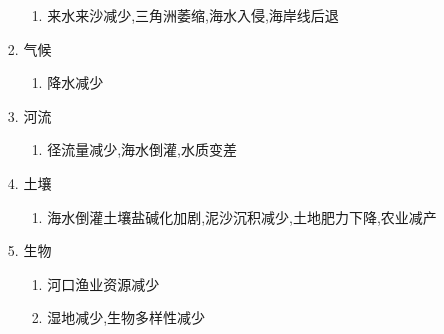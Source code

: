 \documentclass[a4paper]{article}
\begin{document}
\begin{enumerate}
\begin{enumerate}
\begin{enumerate}
                \begin{enumerate}
                    \item 来水来沙减少,三角洲萎缩,海水入侵,海岸线后退 %
                \end{enumerate}
                \item 气候
                \begin{enumerate} %
                    \item 降水减少
                \end{enumerate}
                \item 河流
                \begin{enumerate}
                    \item 径流量减少,海水倒灌,水质变差
                \end{enumerate}
                \item 土壤
                \begin{enumerate}
                    \item 海水倒灌土壤盐碱化加剧,泥沙沉积减少,土地肥力下降,农业减产
                \end{enumerate}
                \item 生物
                \begin{enumerate}
                    \item 河口渔业资源减少
                    \item 湿地减少,生物多样性减少
                \end{enumerate}
            \end{enumerate}
        \end{enumerate}
    \end{enumerate}
\end{document}

